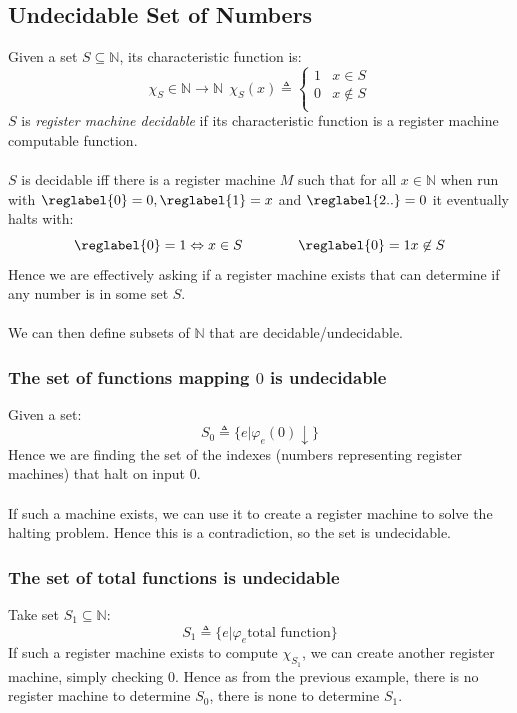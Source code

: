 \subsection{Undecidable Set of Numbers}
Given a set $S \subseteq \mathbb{N}$, its characteristic function is:
\[\chi_S \in \mathbb{N} \to \mathbb{N} \ \ \chi_S(x) \triangleq \begin{cases}
		1 & x \in S     \\
		0 & x \not\in S \\
	\end{cases}\]
$S$ is \textit{register machine decidable} if its characteristic function is a register machine computable function.
\\
\\ $S$ is decidable iff there is a register machine $M$ such that for all $x \in \mathbb{N}$ when run with $\reglabel{0} = 0, \reglabel{1} = x$ and $\reglabel{2..} = 0$ it eventually halts with:
\[\reglabel{0} = 1 \Leftrightarrow x \in S \qquad \qquad \reglabel{0} = 1 x \not\in S \]
Hence we are effectively asking if a register machine exists that can determine if any number is in some set $S$.
\\
\\ We can then define subsets of $\mathbb{N}$ that are decidable/undecidable.

\subsubsection{The set of functions mapping $0$ is undecidable}
Given a set:
\[S_0 \triangleq \{e | \varphi_e(0)\downarrow\}\]
Hence we are finding the set of the indexes (numbers representing register machines) that halt on input $0$.
\\
\\ If such a machine exists, we can use it to create a register machine to solve the halting problem. Hence this is a contradiction, so the set is undecidable.

\subsubsection{The set of total functions is undecidable}
Take set $S_1 \subseteq \mathbb{N}$:
\[S_1 \triangleq \{e | \varphi_e\text{total function}\}\]
If such a register machine exists to compute $\chi_{S_1}$, we can create another register machine, simply checking $0$. Hence as from the previous example, there is no register machine to determine $S_0$, there is none to determine $S_1$.


